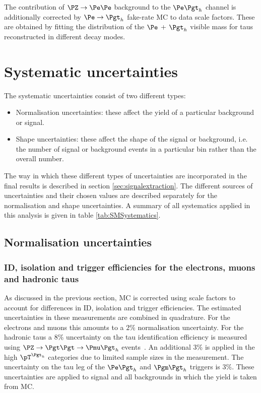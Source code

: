 The contribution of $\PZ \to \Pe\Pe$ background to the $\etau$ channel
is additionally corrected by $\Pe \to \Pgth$ fake-rate \ac{MC} to data
scale factors. These are obtained by fitting the distribution of the $\Pe$ +
$\Pgth$ visible mass for taus reconstructed in different decay modes. 

\section{Systematic uncertainties}
\label{sec:systematics}

The systematic uncertainties consist of two different types:

\begin{itemize} 
\item Normalisation uncertainties: these affect the yield of a particular background or
signal.
\item Shape uncertainties: these affect the shape of the signal or background,
i.e. the number of signal or background events in a particular bin rather
than the overall number.
\end{itemize}

The way in which these different types of uncertainties are incorporated in the
final results is described in section \ref{sec:signalextraction}. The different
sources of uncertainties and their chosen values are described separately for the 
normalisation and shape uncertainties. A summary of all systematics applied in
this analysis is given in table \ref{tab:SMSystematics}.

\subsection{Normalisation uncertainties}
\label{sec:systematicUncertainties_yield}

\subsubsection{\textbf{ID, isolation and trigger efficiencies for the electrons, muons and
hadronic taus}}
As discussed in the previous section, \ac{MC} is corrected using scale factors
to account for differences in ID, isolation and trigger efficiencies. The
estimated uncertainties in these measurements are combined in quadrature. 
For the electrons and muons this amounts to a $2\%$ normalisation uncertainty.
For the hadronic taus a $8\%$ uncertainty on the tau identification efficiency
is measured using $\PZ \to \Pgt\Pgt \to \Pmu\Pgth$
events~\cite{Chatrchyan:2012zz}. An additional 3\% is applied in the high
$\pT^{\Pgth}$ categories due to limited sample sizes in the measurement. 
The uncertainty on the tau leg of the $\etau$ and $\mutau$ triggers is $3\%$.
These uncertainties are applied to signal and all backgrounds in which the yield
is taken from \ac{MC}.


